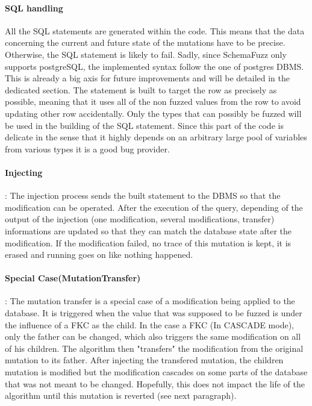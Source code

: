 \documentclass{article}
\begin{document}
\begin{empfile}
				\paragraph{SQL handling}
All the SQL statements are generated within the code. This means that the data concerning the current and future state of the mutations have to be   precise. Otherwise, the SQL statement is   likely to fail. Sadly, since SchemaFuzz only supports postgreSQL, the implemented syntax follow the one of postgres
DBMS. This is already a   big axis for future improvements and will be detailed in the dedicated section.
The statement is built to target the row as precisely as possible, meaning that it uses all of the non fuzzed values from the row to avoid updating other row accidentally. Only the types that can possibly be fuzzed will be used in the building of the SQL statement. Since this part of the code is   delicate in the sense that it highly depends on an arbitrary large pool of variables from various types it is a good bug provider. 
				
				\paragraph{Injecting} :
The injection process sends the built statement to the DBMS so that the modification can be operated. After the execution of the query, depending of the output of the injection (one modification, several modifications, transfer) informations are updated so that they can match the database state after the modification. If the modification failed, no trace of this mutation is kept, it is erased and running goes on like nothing happened.  				
				\paragraph{Special Case(MutationTransfer)} :
The mutation transfer is a special case of a modification being applied to the database.
It is triggered when the value that was supposed to be fuzzed is under the influence of a FKC as the child.
In the case a FKC (In CASCADE mode), only the father can be changed, which also triggers the same modification on all of his children. The algorithm then "transfers" the modification from the original mutation to its father.
After injecting the transfered mutation, the children mutation is modified but the modification cascades on some parts of the database that was not meant to be changed.
Hopefully, this does not impact the life of the algorithm until this mutation is reverted (see next paragraph).

\end{empfile}
\end{document}
